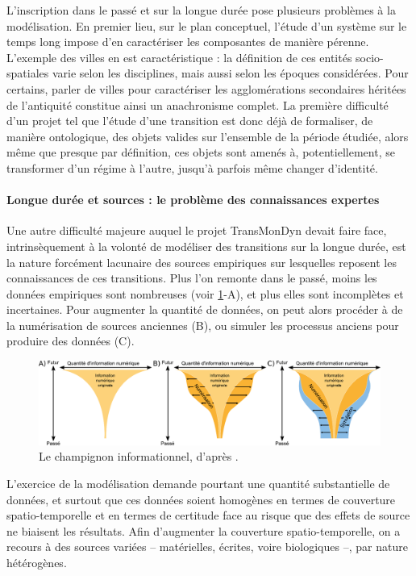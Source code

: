L'inscription dans le passé et sur la longue durée pose plusieurs problèmes à la modélisation.
En premier lieu, sur le plan conceptuel, l'étude d'un système sur le temps long impose d'en caractériser les composantes de manière pérenne.
L'exemple des \og villes \og en est caractéristique :
	la définition de ces entités socio-spatiales varie selon les disciplines, mais aussi selon les époques considérées.
Pour certains, parler de villes pour caractériser les agglomérations secondaires héritées de l'antiquité constitue ainsi un anachronisme complet.
La première difficulté d'un projet tel que l'étude d'une transition est donc déjà de formaliser, de manière ontologique, des objets valides sur l'ensemble de la période étudiée, alors même que presque par définition, ces objets sont amenés à, potentiellement, se transformer d'un régime à l'autre, jusqu'à parfois même changer d'identité.

\paragraph{Longue durée et sources : le problème des \og connaissances expertes\fg{}}

Une autre difficulté majeure auquel le projet TransMonDyn devait faire face, intrinsèquement à la volonté de modéliser des transitions sur la longue durée, est la nature forcément lacunaire des sources empiriques sur lesquelles reposent les connaissances de ces transitions.
Plus l'on remonte dans le passé, moins les données empiriques sont nombreuses (voir \cref{fig:champignon-kaplan}-A), et plus elles sont incomplètes et incertaines.
Pour augmenter la quantité de données, on peut alors procéder à de la numérisation de sources anciennes (B), ou simuler les processus anciens pour produire des données (C).

\begin{figure}[H]
	\centering
	\includegraphics[width=\linewidth]{img/champignon_informationnel_kaplan.pdf}
	\caption{Le \og champignon informationnel\fg{}, d'après \textcite{kaplan_lancement_2013}.}
	\label{fig:champignon-kaplan}
\end{figure}

L'exercice de la modélisation demande pourtant une quantité substantielle de données, et surtout que ces données soient homogènes en termes de couverture spatio-temporelle et en termes de certitude face au risque que des \og effets de source\fg{} ne biaisent les résultats.
Afin d'augmenter la couverture spatio-temporelle, on a recours à des sources variées -- matérielles, écrites, voire biologiques --, par nature hétérogènes.

